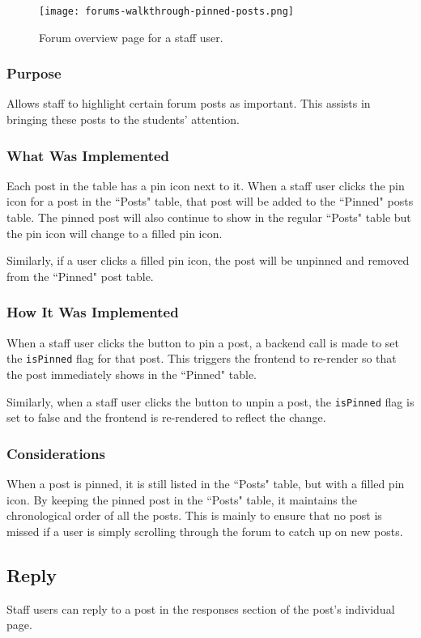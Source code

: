 \begin{figure}[h!]
    \texttt{[image: forums-walkthrough-pinned-posts.png]}
    \centering
    \caption{Forum overview page for a staff user.}
\end{figure}

\subsubsection{Purpose}
Allows staff to highlight certain forum posts as important.
This assists in bringing these posts to the students' attention.

\subsubsection{What Was Implemented}
Each post in the table has a pin icon next to it.
When a staff user clicks the pin icon for a post in the ``Posts" table, that post will be added to the ``Pinned" posts table.
The pinned post will also continue to show in the regular ``Posts" table but the pin icon will change to a filled pin icon.

Similarly, if a user clicks a filled pin icon, the post will be unpinned and removed from the ``Pinned" post table.

\subsubsection{How It Was Implemented}
When a staff user clicks the button to pin a post, a backend call is made to set the \texttt{isPinned} flag for that post.
This triggers the frontend to re-render so that the post immediately shows in the ``Pinned" table.

Similarly, when a staff user clicks the button to unpin a post, the \texttt{isPinned} flag is set to false and the frontend is re-rendered to reflect the change.

\subsubsection{Considerations}
When a post is pinned, it is still listed in the ``Posts" table, but with a filled pin icon.
By keeping the pinned post in the ``Posts" table, it maintains the chronological order of all the posts.
This is mainly to ensure that no post is missed if a user is simply scrolling through the forum to catch up on new posts.

\subsection{Reply}
Staff users can reply to a post in the responses section of the post's individual page.

